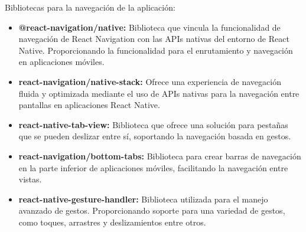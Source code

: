 Bibliotecas para la navegación de la aplicación:
\begin{itemize}

\item \textbf{@react-navigation/native:} Biblioteca que vincula la funcionalidad de navegación de React Navigation con las APIs nativas del entorno de React Native.
Proporcionando la funcionalidad para el enrutamiento y navegación en aplicaciones móviles. 

\item \textbf{react-navigation/native-stack:} Ofrece una experiencia de navegación fluida y optimizada mediante el uso de APIs nativas para la navegación entre pantallas en aplicaciones React Native.

\item \textbf{react-native-tab-view:} Biblioteca que ofrece una solución para pestañas que se pueden deslizar entre sí, soportando la navegación basada en gestos.

\item \textbf{react-navigation/bottom-tabs:} Biblioteca para crear barras de navegación en la parte inferior de aplicaciones móviles, facilitando la navegación entre vistas.

\item \textbf{react-native-gesture-handler:} Biblioteca utilizada para el manejo avanzado de gestos. Proporcionando soporte para una variedad de gestos, como toques, arrastres y deslizamientos entre otros.

\end{itemize}



